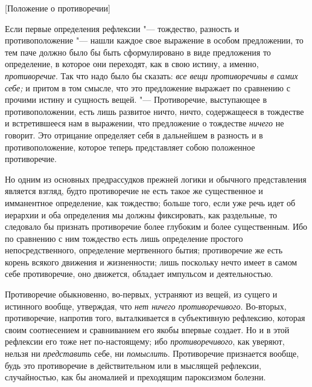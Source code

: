 %
  {[Положение о противоречии]}

Если первые определения рефлексии "--- тождество, разность и противоположение
"--- нашли каждое свое выражение в особом предложении, то тем паче должно было
бы быть сформулировано в виде предложения то определение, в которое они
переходят, как в свою истину, а именно,
{\em противоречие}. Так что надо было бы сказать:
{\em все вещи противоречивы в самих себе;} и притом в
том смысле, что это предложение выражает по сравнению с прочими истину и
сущность вещей. "--- Противоречие, выступающее в противоположении, есть лишь
развитое ничто, ничто, содержащееся в тождестве и встретившееся нам в
выражении, что предложение о тождестве {\em ничего} не
говорит. Это отрицание определяет себя в дальнейшем в разность и в
противоположение, которое теперь представляет собою положенное противоречие.

Но одним из основных предрассудков прежней логики и обычного представления
является взгляд, будто противоречие не есть такое же существенное и
имманентное определение, как тождество; больше того, если уже речь идет об
иерархии и оба определения мы должны фиксировать, как раздельные, то
следовало бы признать противоречие более глубоким и более существенным. Ибо
по сравнению с ним тождество есть лишь определение простого
непосредственного, определение мертвенного бытия; противоречие же есть
корень всякого движения и жизненности; лишь поскольку нечто имеет в самом
себе противоречие, оно движется, обладает импульсом и деятельностью.

Противоречие обыкновенно, во-первых, устраняют из вещей, из сущего и
истинного вообще, утверждая, что {\em нет ничего
противоречивого}. Во-вторых, противоречие, напротив того, выталкивается в
субъективную рефлексию, которая своим соотнесением и сравниванием его якобы
впервые создает. Но и в этой рефлексии его тоже нет по-настоящему; ибо
{\em противоречивого}, как уверяют, нельзя ни {\em представить} себе, ни
{\em помыслить}. Противоречие признается вообще, будь
это противоречие в действительном или в мыслящей рефлексии, случайностью,
как бы аномалией и преходящим пароксизмом болезни.


